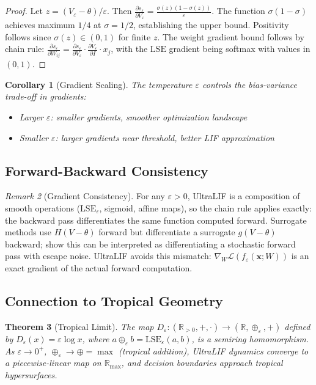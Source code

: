 \documentclass{article}
\theoremstyle{plain}
\newtheorem{theorem}{Theorem}[section]
\newtheorem{corollary}[theorem]{Corollary}
\theoremstyle{definition}
\theoremstyle{remark}
\newtheorem{remark}[theorem]{Remark}
\newcommand{\lse}{\mathrm{LSE}}
\newcommand{\R}{\mathbb{R}}
\newcommand{\eps}{\varepsilon}
\begin{document}
\begin{proof}
Let $z = (V_\eps - \theta)/\eps$. Then $\frac{\partial s_\eps}{\partial V_\eps} = \frac{\sigma(z)(1-\sigma(z))}{\eps}$. The function $\sigma(1-\sigma)$ achieves maximum $1/4$ at $\sigma = 1/2$, establishing the upper bound. Positivity follows since $\sigma(z) \in (0,1)$ for finite $z$. The weight gradient bound follows by chain rule: $\frac{\partial s_\eps}{\partial W_{ij}} = \frac{\partial s_\eps}{\partial V_\eps} \cdot \frac{\partial V_\eps}{\partial I} \cdot x_j$, with the $\lse$ gradient being softmax with values in $(0,1)$.
\end{proof}

\begin{corollary}[Gradient Scaling]
\label{cor:scaling}
The temperature $\eps$ controls the bias-variance trade-off in gradients:
\begin{itemize}
    \item Larger $\eps$: smaller gradients, smoother optimization landscape
    \item Smaller $\eps$: larger gradients near threshold, better LIF approximation
\end{itemize}
\end{corollary}

\subsection{Forward-Backward Consistency}

\begin{remark}[Gradient Consistency]
\label{thm:consistency}
For any $\eps > 0$, UltraLIF is a composition of smooth operations ($\lse_\eps$, sigmoid, affine maps), so the chain rule applies exactly: the backward pass differentiates the same function computed forward. Surrogate methods use $H(V{-}\theta)$ forward but differentiate a surrogate $g(V{-}\theta)$ backward; \citet{gygax2025elucidating} show this can be interpreted as differentiating a stochastic forward pass with escape noise. UltraLIF avoids this mismatch: $\nabla_W \mathcal{L}(f_\eps(\mathbf{x}; W))$ is an exact gradient of the actual forward computation.
\end{remark}

\subsection{Connection to Tropical Geometry}

\begin{theorem}[Tropical Limit]
\label{thm:tropical}
The map $D_\eps: (\R_{>0}, +, \cdot) \to (\R, \oplus_\eps, +)$ defined by $D_\eps(x) = \eps \log x$, where $a \oplus_\eps b = \lse_\eps(a, b)$, is a semiring homomorphism. As $\eps \to 0^+$, $\oplus_\eps \to \oplus = \max$ (tropical addition), UltraLIF dynamics converge to a piecewise-linear map on $\R_{\max}$, and decision boundaries approach tropical hypersurfaces.
\end{theorem}
\end{document}
